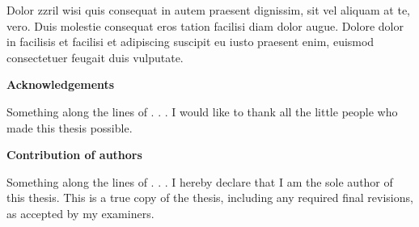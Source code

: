 Dolor zzril wisi quis consequat in autem praesent dignissim, sit vel aliquam at te, vero. Duis molestie consequat eros tation facilisi diam dolor augue. Dolore dolor in facilisis et facilisi et adipiscing suscipit eu iusto praesent enim, euismod consectetuer feugait duis vulputate.

\cleardoublepage


\begin{center}\textbf{Acknowledgements}\end{center}

Something along the lines of . . . I would like to thank all the little people who made this thesis possible.
\cleardoublepage

 \begin{center}\textbf{Contribution of authors}\end{center}
  
 \noindent
Something along the lines of . . . I hereby declare that I am the sole author of this thesis. This is a true copy of the thesis, including any required final revisions, as accepted by my examiners.

\cleardoublepage




